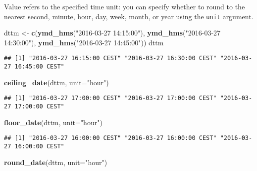 \documentclass[]{book}
\newenvironment{Shaded}{\begin{snugshade}}{\end{snugshade}}
\newcommand{\KeywordTok}[1]{\textcolor[rgb]{0.13,0.29,0.53}{\textbf{{#1}}}}
\newcommand{\DataTypeTok}[1]{\textcolor[rgb]{0.13,0.29,0.53}{{#1}}}
\newcommand{\StringTok}[1]{\textcolor[rgb]{0.31,0.60,0.02}{{#1}}}
\newcommand{\NormalTok}[1]{{#1}}
\begin{document}
Value refers to the specified time unit: you can specify whether to
round to the nearest second, minute, hour, day, week, month, or year
using the \texttt{unit} argument.

\begin{Shaded}
\begin{Highlighting}[]
\NormalTok{dttm <-}\StringTok{ }\KeywordTok{c}\NormalTok{(}\KeywordTok{ymd_hms}\NormalTok{(}\StringTok{"2016-03-27 14:15:00"}\NormalTok{), }\KeywordTok{ymd_hms}\NormalTok{(}\StringTok{"2016-03-27 14:30:00"}\NormalTok{), }
          \KeywordTok{ymd_hms}\NormalTok{(}\StringTok{"2016-03-27 14:45:00"}\NormalTok{))}
\NormalTok{dttm}
\end{Highlighting}
\end{Shaded}

\begin{verbatim}
## [1] "2016-03-27 16:15:00 CEST" "2016-03-27 16:30:00 CEST" "2016-03-27 16:45:00 CEST"
\end{verbatim}

\begin{Shaded}
\begin{Highlighting}[]
\KeywordTok{ceiling_date}\NormalTok{(dttm, }\DataTypeTok{unit=}\StringTok{"hour"}\NormalTok{)}
\end{Highlighting}
\end{Shaded}

\begin{verbatim}
## [1] "2016-03-27 17:00:00 CEST" "2016-03-27 17:00:00 CEST" "2016-03-27 17:00:00 CEST"
\end{verbatim}

\begin{Shaded}
\begin{Highlighting}[]
\KeywordTok{floor_date}\NormalTok{(dttm, }\DataTypeTok{unit=}\StringTok{"hour"}\NormalTok{)}
\end{Highlighting}
\end{Shaded}

\begin{verbatim}
## [1] "2016-03-27 16:00:00 CEST" "2016-03-27 16:00:00 CEST" "2016-03-27 16:00:00 CEST"
\end{verbatim}

\begin{Shaded}
\begin{Highlighting}[]
\KeywordTok{round_date}\NormalTok{(dttm, }\DataTypeTok{unit=}\StringTok{"hour"}\NormalTok{)}
\end{Highlighting}
\end{Shaded}
\end{document}
